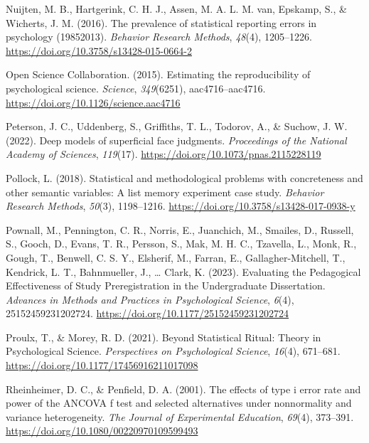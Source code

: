 \documentclass[
  man]{apa7}
\newlength{\cslhangindent}
\newenvironment{CSLReferences}[2] %
 {\begin{list}{}{%
  \setlength{\itemindent}{0pt}
  \setlength{\leftmargin}{0pt}
  \setlength{\parsep}{0pt}
  \ifodd #1
   \setlength{\leftmargin}{\cslhangindent}
   \setlength{\itemindent}{-1\cslhangindent}
  \fi
  \setlength{\itemsep}{#2\baselineskip}}}
 {\end{list}}
\begin{document}
\begin{CSLReferences}{1}{0}
Nuijten, M. B., Hartgerink, C. H. J., Assen, M. A. L. M. van, Epskamp, S., \& Wicherts, J. M. (2016). The prevalence of statistical reporting errors in psychology (1985{\textendash}2013). \emph{Behavior Research Methods}, \emph{48}(4), 1205--1226. \url{https://doi.org/10.3758/s13428-015-0664-2}

Open Science Collaboration. (2015). Estimating the reproducibility of psychological science. \emph{Science}, \emph{349}(6251), aac4716--aac4716. \url{https://doi.org/10.1126/science.aac4716}

Peterson, J. C., Uddenberg, S., Griffiths, T. L., Todorov, A., \& Suchow, J. W. (2022). Deep models of superficial face judgments. \emph{Proceedings of the National Academy of Sciences}, \emph{119}(17). \url{https://doi.org/10.1073/pnas.2115228119}

Pollock, L. (2018). Statistical and methodological problems with concreteness and other semantic variables: A list memory experiment case study. \emph{Behavior Research Methods}, \emph{50}(3), 1198--1216. \url{https://doi.org/10.3758/s13428-017-0938-y}

Pownall, M., Pennington, C. R., Norris, E., Juanchich, M., Smailes, D., Russell, S., Gooch, D., Evans, T. R., Persson, S., Mak, M. H. C., Tzavella, L., Monk, R., Gough, T., Benwell, C. S. Y., Elsherif, M., Farran, E., Gallagher-Mitchell, T., Kendrick, L. T., Bahnmueller, J., \ldots{} Clark, K. (2023). Evaluating the Pedagogical Effectiveness of Study Preregistration in the Undergraduate Dissertation. \emph{Advances in Methods and Practices in Psychological Science}, \emph{6}(4), 25152459231202724. \url{https://doi.org/10.1177/25152459231202724}

Proulx, T., \& Morey, R. D. (2021). Beyond Statistical Ritual: Theory in Psychological Science. \emph{Perspectives on Psychological Science}, \emph{16}(4), 671--681. \url{https://doi.org/10.1177/17456916211017098}

Rheinheimer, D. C., \& Penfield, D. A. (2001). The effects of type i error rate and power of the ANCOVA f test and selected alternatives under nonnormality and variance heterogeneity. \emph{The Journal of Experimental Education}, \emph{69}(4), 373--391. \url{https://doi.org/10.1080/00220970109599493}


\end{CSLReferences}
\end{document}

